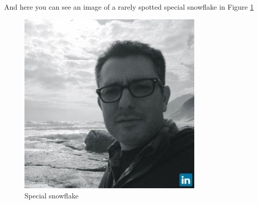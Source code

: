 And here you can see an image of a rarely spotted special snowflake in Figure \ref{fig:snowflake}
\begin{figure}[H]
    \centering
    \includegraphics[width=88mm]{chapters/03/images/snow_flake}
    \caption{Special snowflake}
    \label{fig:snowflake}
\end{figure}